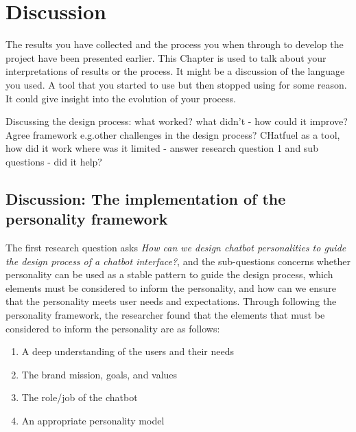 \chapter{Discussion}
\label{chap:discussion}

The results you have collected and the process you when through to develop the project have been presented earlier.  This Chapter is used to talk about your interpretations of results or the process.  It might be a discussion of the language you used.  A tool that you started to use but then stopped using for some reason.  It could give insight into the evolution of your process.

Discussing the design process: what worked? what didn't - how could it improve? Agree framework e.g.other challenges in the design process? CHatfuel as a tool, how did it work where was it limited - answer research question 1 and sub questions - did it help?

\section{Discussion: The implementation of the personality framework}

The first research question asks \textit{How can we design chatbot personalities to guide the design process of a chatbot interface?}, and the sub-questions concerns whether personality can be used as a stable pattern to guide the design process, which elements must be considered to inform the personality, and how can we ensure that the personality meets user needs and expectations. Through following the personality framework, the researcher found that the elements that must be considered to inform the personality are as follows:

\begin{enumerate}
    \item A deep understanding of the users and their needs
    \item The brand mission, goals, and values
    \item The role/job of the chatbot
    \item An appropriate personality model
\end{enumerate}

